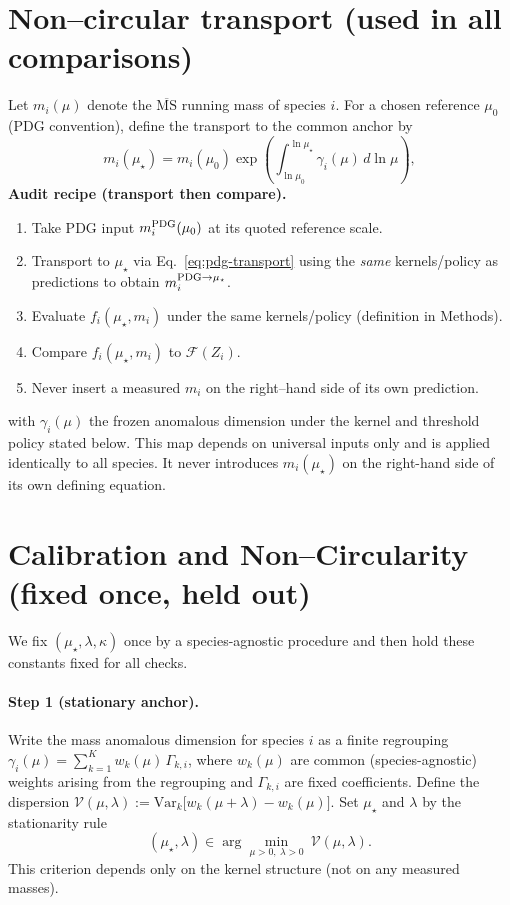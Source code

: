 \documentclass[epjc3]{svjour3}
\begin{document}
\section{Non–circular transport (used in all comparisons)}
Let $m_i(\mu)$ denote the $\overline{\mathrm{MS}}$ running mass of species $i$. For a chosen reference $\mu_0$ (PDG convention), define the transport to the common anchor by
\[
m_i(\mu_\star)=m_i(\mu_0)\exp\!\left(\int_{\ln\mu_0}^{\ln\mu_\star}\gamma_i(\mu)\,d\ln\mu\right),
\label{eq:pdg-transport}
\]
\noindent\textbf{Audit recipe (transport then compare).}
\begin{enumerate}[label={(\roman*)}]
  \item Take PDG input $m_i^{\rm PDG}(\mu_0)$ at its quoted reference scale.
  \item Transport to $\mu_\star$ via Eq.~\eqref{eq:pdg-transport} using the \emph{same} kernels/policy as predictions to obtain $m_i^{\rm PDG\to\mu_\star}$.
  \item Evaluate $f_i(\mu_\star,m_i)$ under the same kernels/policy (definition in Methods).
  \item Compare $f_i(\mu_\star,m_i)$ to $\mathcal F(Z_i)$.
  \item Never insert a measured $m_i$ on the right–hand side of its own prediction.
\end{enumerate}
with $\gamma_i(\mu)$ the frozen anomalous dimension under the kernel and threshold policy stated below. This map depends on universal inputs only and is applied identically to all species. It never introduces $m_i(\mu_\star)$ on the right-hand side of its own defining equation.

\section{Calibration and Non–Circularity (fixed once, held out)}
We fix $(\mu_\star,\lambda,\kappa)$ once by a species-agnostic procedure and then hold these constants fixed for all checks.

\paragraph{Step 1 (stationary anchor).}
Write the mass anomalous dimension for species $i$ as a finite regrouping
$\gamma_i(\mu)=\sum_{k=1}^K w_k(\mu)\,\Gamma_{k,i}$,
where $w_k(\mu)$ are common (species-agnostic) weights arising from the regrouping and $\Gamma_{k,i}$ are fixed coefficients.
Define the dispersion $\mathcal{V}(\mu,\lambda):=\mathrm{Var}_k\!\big[w_k(\mu+\lambda)-w_k(\mu)\big]$.
Set $\mu_\star$ and $\lambda$ by the stationarity rule
\[
(\mu_\star,\lambda)\in\arg\min_{\mu>0,\ \lambda>0}\ \mathcal{V}(\mu,\lambda).
\]
This criterion depends only on the kernel structure (not on any measured masses).
\end{document}

